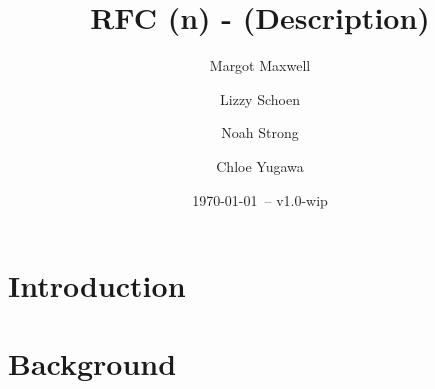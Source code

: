 \documentclass[12pt]{article}
\title{RFC (n) - (Description)}
\author{
	Margot Maxwell \and
	Lizzy Schoen \and
	Noah Strong \and
	Chloe Yugawa
}
\date{\today\ -- v1.0-wip}
\begin{document}
\maketitle

\tableofcontents{}

\section{Introduction}

\section{Background}
\end{document}
